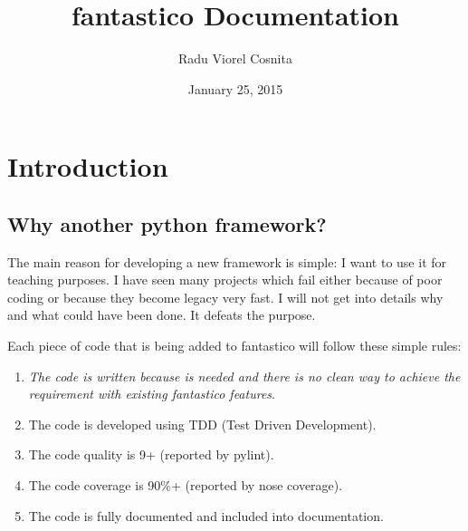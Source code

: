 \documentclass[letterpaper,10pt,english]{sphinxmanual}
\title{fantastico Documentation}
\date{January 25, 2015}
\author{Radu Viorel Cosnita}
\begin{document}
\maketitle
\tableofcontents
{}\label{index::doc}



\chapter{Introduction}
\label{intro:introduction}\label{intro::doc}\label{intro:fantastico-framework}

\section{Why another python framework?}
\label{intro:why-another-python-framework}
The main reason for developing a new framework is simple: I want to use it for teaching purposes. I have seen many projects which
fail either because of poor coding or because they become legacy very fast. I will not get into details why and what could have
been done. It defeats the purpose.

Each piece of code that is being added to fantastico will follow these simple rules:
\begin{enumerate}
\item {} 
\emph{The code is written because is needed and there is no clean way to achieve the requirement with existing fantastico features}.

\item {} 
The code is developed using TDD (Test Driven Development).

\item {} 
The code quality is 9+ (reported by pylint).

\item {} 
The code coverage is 90\%+ (reported by nose coverage).

\item {} 
The code is fully documented and included into documentation.

\end{enumerate}
\end{document}
